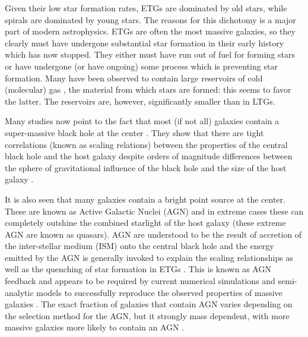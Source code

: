 Given their low star formation rates, ETGs are dominated by old stars, while spirals are dominated by young stars. The reasons for this dichotomy is a major part of modern astrophysics. ETGs are often the most massive galaxies, so they clearly must have undergone substantial star formation in their early history which has now stopped. They either must have run out of fuel for forming stars or have undergone (or have ongoing) some process which is preventing star formation. Many have been observed to contain large reservoirs of cold (molecular) gas \citep{}, the material from which stars are formed: this seems to favor the latter. The reservoirs are, however, significantly smaller than in LTGs.

Many studies now point to the fact that most (if not all) galaxies contain a super-massive black hole at the center \citep{Kormendy2013a}. They show that there are tight correlations (known as scaling relations) between the properties of the central black hole and the host galaxy despite orders of magnitude differences between the sphere of gravitational influence of the black hole and the size of the host galaxy \citep{Gudehus1973, Faber1976, Ferrarese2000, Gebhardt2000}. 

It is also seen that many galaxies contain a bright point source at the center. These are known as Active Galactic Nuclei (AGN) and in extreme cases these can completely outshine the combined starlight of the host galaxy (these extreme AGN are known as quasars). AGN are understood to be the result of accretion of the inter-stellar medium (ISM) onto the central black hole \citep{Lynden-Bell1969} and the energy emitted by the AGN is generally invoked to explain the scaling relationships \citep{Raimundo2010} as well as the quenching of star formation in ETGs \citep{Croton2006, Somerville2008}. This is known as AGN feedback and appears to be required by current numerical simulations and semi-analytic models to successfully reproduce the observed properties of massive galaxies \citep{Kauffmann2000, Granato2004, DiMatteo2005, Springel2005, Bower2006, Croton2006, Hopkins2006, Ciotti2010, Scannapieco2012}. The exact fraction of galaxies that contain AGN varies depending on the selection method for the AGN, but it strongly mass dependent, with more massive galaxies more likely to contain an AGN \citep{Kauffmann2003a}. 

